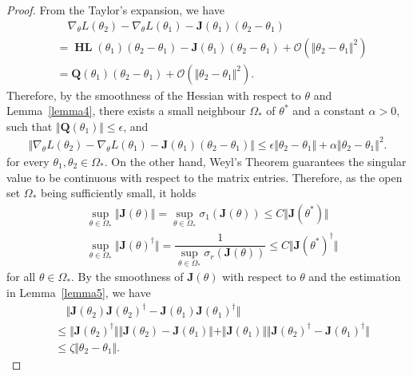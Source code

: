 \documentclass[a4paper, 11pt]{article}
\numberwithin{equation}{section}
\begin{document}
\begin{proof}
From the Taylor's expansion, we have 
\begin{align}
 &\quad \nabla_{\theta}L(\theta_2)  - \nabla_{\theta}L(\theta_1)  - \boldsymbol{J} (\theta_1)  \left( \theta_2 - \theta_1 \right) \\
 &= \boldsymbol{\operatorname{HL}}(\theta_1) \left( \theta_2 - \theta_1 \right) - \boldsymbol{J} (\theta_1) \left( \theta_2 - \theta_1 \right) + \mathcal{O}(\Vert \theta_2 - \theta_1 \Vert^2)   \\
&=\boldsymbol{Q} (\theta_1)\left( \theta_2 - \theta_1 \right) + \mathcal{O}(\Vert \theta_2 - \theta_1 \Vert^2).
\end{align}
Therefore, by the smoothness of the Hessian with respect to $\theta$ and Lemma~\ref{lemma4}, there exists a small neighbour $\Omega_*$ of $\theta^*$ and a constant $\alpha > 0$, such that $\Vert \boldsymbol{Q} (\theta_1) \Vert \leq \epsilon$, and 
\begin{align}
\Vert \nabla_{\theta}L(\theta_2)  - \nabla_{\theta}L(\theta_1)  -\boldsymbol{J} (\theta_1) \left( \theta_2 - \theta_1 \right) \Vert \leq  \epsilon\Vert \theta_2 - \theta_1 \Vert + \alpha \Vert \theta_2 - \theta_1 \Vert^2.
\end{align}
for every $\theta_1, \theta_2 \in \Omega_{*}$. On the other hand, Weyl’s Theorem guarantees the singular value to be continuous with respect to the matrix entries. Therefore, as the open set $\Omega_{*}$ being sufficiently small, it holds
\begin{align}
&\sup_{\theta \in \Omega_*}\Vert  \boldsymbol{J} (\theta) \Vert  = \sup_{\theta \in \Omega_*} \sigma_1( \boldsymbol{J} (\theta))  \leq C \Vert \boldsymbol{J} (\theta^*)\Vert \\ 
&\sup_{\theta \in \Omega_*}\Vert  \boldsymbol{J} (\theta) ^{\dagger} \Vert  = 
\dfrac{1}{\sup_{\theta \in \Omega_*} \sigma_r( \boldsymbol{J} (\theta)) } \leq C  \Vert \boldsymbol{J} (\theta^*)^{\dagger} \Vert
\end{align}
for all $\theta \in \Omega_*$. By the smoothness of $\boldsymbol{J} (\theta)$ with respect to $\theta$ and the estimation in Lemma~\ref{lemma5}, we have 
\begin{align}
&\quad \Vert \boldsymbol{J} (\theta_2)  \boldsymbol{J} (\theta_2) ^{\dagger} - \boldsymbol{J} (\theta_1)  \boldsymbol{J} (\theta_1) ^{\dagger} \Vert  \\ 
& \leq \Vert \boldsymbol{J} (\theta_2)^{\dagger} \Vert \Vert \boldsymbol{J} (\theta_2)  - \boldsymbol{J} (\theta_1) \Vert + \Vert \boldsymbol{J} (\theta_1) \Vert \Vert \boldsymbol{J} (\theta_2) ^{\dagger}  -\boldsymbol{J} (\theta_1) ^{\dagger}   \Vert\\
&\leq \zeta \Vert \theta_2 - \theta_1 \Vert.
\end{align}
\end{proof}
\end{document}
